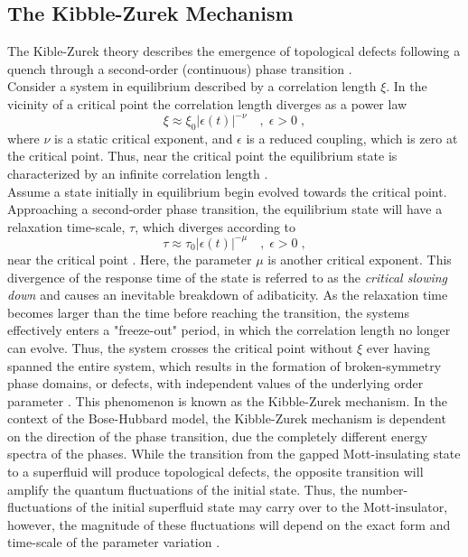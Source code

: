 \subsection{The Kibble-Zurek Mechanism}
The Kible-Zurek theory describes the emergence of topological defects following a quench through a second-order (continuous) phase transition \cite{Zurek2005}.\\
Consider a system in equilibrium described by a correlation length $\xi$. In the vicinity of a critical point the correlation length diverges as a power law
\begin{equation}
	\xi  \approx \xi_0 |\epsilon (t)|^{-\nu} \quad , \; \epsilon > 0 \; ,
\end{equation} 
where $\nu$ is a static critical exponent, and $\epsilon$ is a reduced coupling, which is zero at the critical point. Thus, near the critical point the equilibrium state is characterized by an infinite correlation length \cite{Kibble1976}.\\
Assume a state initially in equilibrium begin evolved towards the critical point.  Approaching a second-order phase transition, the equilibrium state will have a relaxation time-scale, $\tau$, which diverges according to
\begin{equation}
	\tau \approx \tau_0 |\epsilon (t)|^{-\mu} \quad , \; \epsilon > 0 \; ,
\end{equation}
near the critical point \cite{Zurek2005}. Here, the parameter $\mu$ is another critical exponent. This divergence of the response time of the state is referred to as the \textit{critical slowing down} and causes an inevitable breakdown of adibaticity. As the relaxation time becomes larger than the time before reaching the transition, the systems effectively enters a "freeze-out" period, in which the correlation length no longer can evolve. Thus, the system crosses the critical point without $\xi$ ever having spanned the entire system, which results in the formation of broken-symmetry phase domains, or defects, with independent values of the underlying order parameter \cite{Gillman2018}. This phenomenon is known as the Kibble-Zurek mechanism.
In the context of the Bose-Hubbard model, the Kibble-Zurek mechanism is dependent on the direction of the phase transition, due the completely different energy spectra of the phases. While the transition from the gapped Mott-insulating state to a superfluid will produce topological defects, the opposite transition will amplify the quantum fluctuations of the initial state. Thus, the number-fluctuations of the initial superfluid state may carry over to the Mott-insulator, however, the magnitude of these fluctuations will depend on the exact form and time-scale of the parameter variation \cite{Schutzhold2006}.


